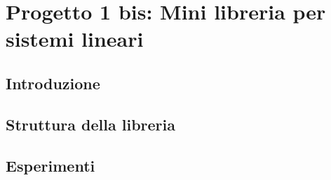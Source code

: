 \chapter{Progetto 1 bis: Mini libreria per sistemi lineari}
\section{Introduzione}
\section{Struttura della libreria}
\section{Esperimenti}